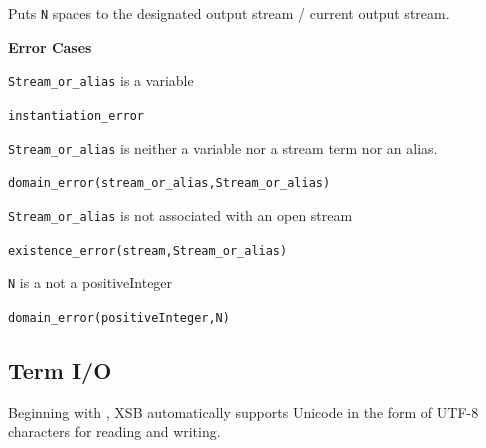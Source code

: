 \begin{description}
    Puts {\tt N} spaces to the designated output stream / current output stream. 

{\bf Error Cases}
\bi
\item 	{\tt Stream\_or\_alias} is a variable
\bi
\item {\tt instantiation\_error}
\ei
\item 	{\tt Stream\_or\_alias} is neither a variable nor a stream term nor an alias.
\bi
\item 	{\tt domain\_error(stream\_or\_alias,Stream\_or\_alias)}
\ei
\item 	{\tt Stream\_or\_alias} is not associated with an open stream
\bi
\item 	{\tt existence\_error(stream,Stream\_or\_alias)}
\ei
\item 	{\tt N} is a not a positiveInteger
\bi
\item 	{\tt domain\_error(positiveInteger,N)}
\ei
\ei

%
\end{description}

\subsection{Term I/O}
Beginning with \version{}, XSB automatically supports Unicode in the
form of UTF-8 characters for reading and writing.

